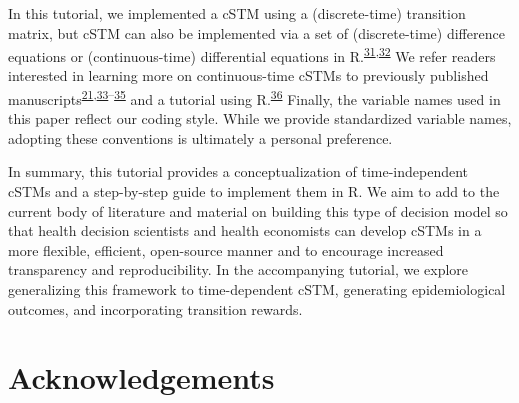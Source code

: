 \documentclass[
]{article}
\begin{document}
In this tutorial, we implemented a cSTM using a (discrete-time) transition matrix, but cSTM can also be implemented via a set of (discrete-time) difference equations or (continuous-time) differential equations in R.\textsuperscript{\protect\hyperlink{ref-Grimmett2014}{31},\protect\hyperlink{ref-Axler2005}{32}} We refer readers interested in learning more on continuous-time cSTMs to previously published manuscripts\textsuperscript{\protect\hyperlink{ref-VanRosmalen2013}{21},\protect\hyperlink{ref-Cao2016}{33}--\protect\hyperlink{ref-Soares2012}{35}} and a tutorial using R.\textsuperscript{\protect\hyperlink{ref-Frederix2013a}{36}} Finally, the variable names used in this paper reflect our coding style. While we provide standardized variable names, adopting these conventions is ultimately a personal preference.

In summary, this tutorial provides a conceptualization of time-independent cSTMs and a step-by-step guide to implement them in R. We aim to add to the current body of literature and material on building this type of decision model so that health decision scientists and health economists can develop cSTMs in a more flexible, efficient, open-source manner and to encourage increased transparency and reproducibility. In the accompanying tutorial, we explore generalizing this framework to time-dependent cSTM, generating epidemiological outcomes, and incorporating transition rewards.

\hypertarget{acknowledgements}{%
\section{Acknowledgements}\label{acknowledgements}}
\end{document}
